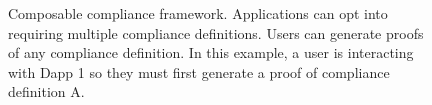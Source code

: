 \documentclass[9pt]{extreport}
\begin{document}
\begin{figure}[htbp]
\caption[Composable compliance framework overview]{Composable compliance framework. Applications can opt into requiring multiple compliance definitions.  Users can generate proofs of any compliance definition.  In this example, a user is interacting with Dapp 1 so they must first generate a proof of compliance definition A.}

\label{fig:compliance-framework-overview}
\end{figure}
\end{document}
